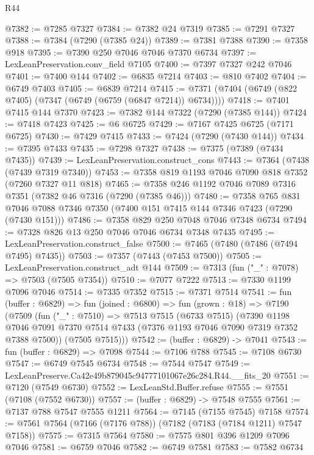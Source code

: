 \begin{lexlean}{R44}
\begin{coremodule}
{@7382 := @7285 @7327
@7384 := @7382 @24 @7319
@7385 := @7291 @7327
@7388 := @7384 (@7290 (@7385 @24))
@7389 := @7381 @7388
@7390 := @7358 @918
@7395 := @7390 @250 @7046 @7046 @7370 @6734
@7397 := LexLeanPreservation.conv_field @7105
@7400 := @7397 @7327 @242 @7046
@7401 := @7400 @144
@7402 := @6835 @7214
@7403 := @810 @7402
@7404 := @6749 @7403
@7405 := @6839 @7214
@7415 := @7371 (@7404 (@6749 (@822 @7405) (@7347 (@6749 (@6759 (@6847 @7214)) @6734))))
@7418 := @7401 @7415 @144 @7370
@7423 := @7382 @144 @7322 (@7290 (@7385 @144))
@7424 := @7418 @7423
@7425 := @6 @6725
@7429 := @7167 @7425 @6725 (@7171 @6725)
@7430 := @7429 @7415
@7433 := @7424 (@7290 (@7430 @144))
@7434 := @7395 @7433
@7435 := @7298 @7327
@7438 := @7375 (@7389 (@7434 @7435))
@7439 := LexLeanPreservation.construct_cons
@7443 := @7364 (@7438 (@7439 @7319 @7340))
@7453 := @7358 @819 @1193 @7046 @7090 @818 @7352 (@7260 @7327 @11 @818)
@7465 := @7358 @246 @1192 @7046 @7089 @7316 @7351 (@7382 @46 @7316 (@7290 (@7385 @46)))
@7480 := @7358
    @765
    @831
    @7046
    @7088
    @7346
    @7350
    (@7400 @151 @7415 @144 @7346 @7423 (@7290 (@7430 @151)))
@7486 := @7358 @829 @250 @7048 @7046 @7348 @6734
@7494 := @7328 @826 @13 @250 @7046 @7046 @6734 @7348 @7435
@7495 := LexLeanPreservation.construct_false
@7500 := @7465 (@7480 (@7486 (@7494 @7495) @7435))
@7503 := @7357 (@7443 (@7453 @7500))
@7505 := LexLeanPreservation.construct_adt @144
@7509 := @7313 (fun ("_" : @7078) => @7503 (@7505 @7354))
@7510 := @7077 @7222
@7513 := @7330 @1199 @7096 @7046
@7514 := @7335 @7352
@7515 := @7371 @7514
@7541 := fun (buffer : @6829) =>
  fun (joined : @6800) =>
  fun (grown : @18) =>
  @7190
    (@7509
      (fun ("_" : @7510) =>
      @7513
        @7515
        (@6733 @7515)
        (@7390
          @1198
          @7046
          @7091
          @7370
          @7514
          @7433
          (@7376 @1193 @7046 @7090 @7319 @7352 @7388 @7500))
        (@7505 @7515)))
@7542 := (buffer : @6829) -> @7041
@7543 := fun (buffer : @6829) => @7098
@7544 := @7106 @788
@7545 := @7108 @6730
@7547 := @6749 @7545 @6734
@7548 := @7544 @7547
@7549 := LexLeanPreserve.Ca42e49b879045c94777101067e26c284.R44.__fits_20
@7551 := @7120 (@7549 @6730)
@7552 := LexLeanStd.Buffer.refuse
@7555 := @7551 (@7108 (@7552 @6730))
@7557 := (buffer : @6829) -> @7548 @7555
@7561 := @7137 @788 @7547 @7555 @1211
@7564 := @7145 (@7155 @7545) @7158
@7574 := @7561 @7564 (@7166 (@7176 @788)) (@7182 (@7183 (@7184 @1211) @7547 @7158))
@7575 := @7315 @7564
@7580 := @7575 @801 @396 @1209 @7096 @7046
@7581 := @6759 @7046
@7582 := @6749 @7581
@7583 := @7582 @6734
}
\end{coremodule}
\end{lexlean}
